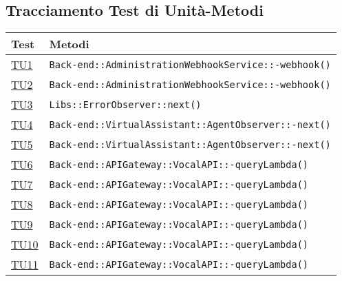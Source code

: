 \subsection{Tracciamento Test di Unità-Metodi}
\normalsize
\begin{longtable}{|>{\centering}m{1cm}|m{12cm}<{\centering}|}
\hline 
\textbf{Test} & \textbf{Metodi}\\
\hline
\endhead
\hyperlink{TU1}{TU1} & \texttt{Back-end::AdministrationWebhookService::-\linebreak webhook()}\\ \hline

\hyperlink{TU2}{TU2} & \texttt{Back-end::AdministrationWebhookService::-\linebreak webhook()}\\ \hline

\hyperlink{TU3}{TU3} & \texttt{Libs::ErrorObserver::next()}\\ \hline

\hyperlink{TU4}{TU4} & \texttt{Back-end::VirtualAssistant::AgentObserver::-\linebreak next()}\\ \hline

\hyperlink{TU5}{TU5} & \texttt{Back-end::VirtualAssistant::AgentObserver::-\linebreak next()}\\ \hline

\hyperlink{TU6}{TU6} & \texttt{Back-end::APIGateway::VocalAPI::-\linebreak queryLambda()}\\ \hline

\hyperlink{TU7}{TU7} & \texttt{Back-end::APIGateway::VocalAPI::-\linebreak queryLambda()}\\ \hline

\hyperlink{TU8}{TU8} & \texttt{Back-end::APIGateway::VocalAPI::-\linebreak queryLambda()}\\ \hline

\hyperlink{TU9}{TU9} & \texttt{Back-end::APIGateway::VocalAPI::-\linebreak queryLambda()}\\ \hline

\hyperlink{TU10}{TU10} & \texttt{Back-end::APIGateway::VocalAPI::-\linebreak queryLambda()}\\ \hline

\hyperlink{TU11}{TU11} & \texttt{Back-end::APIGateway::VocalAPI::-\linebreak queryLambda()}\\ \hline


\end{longtable}
